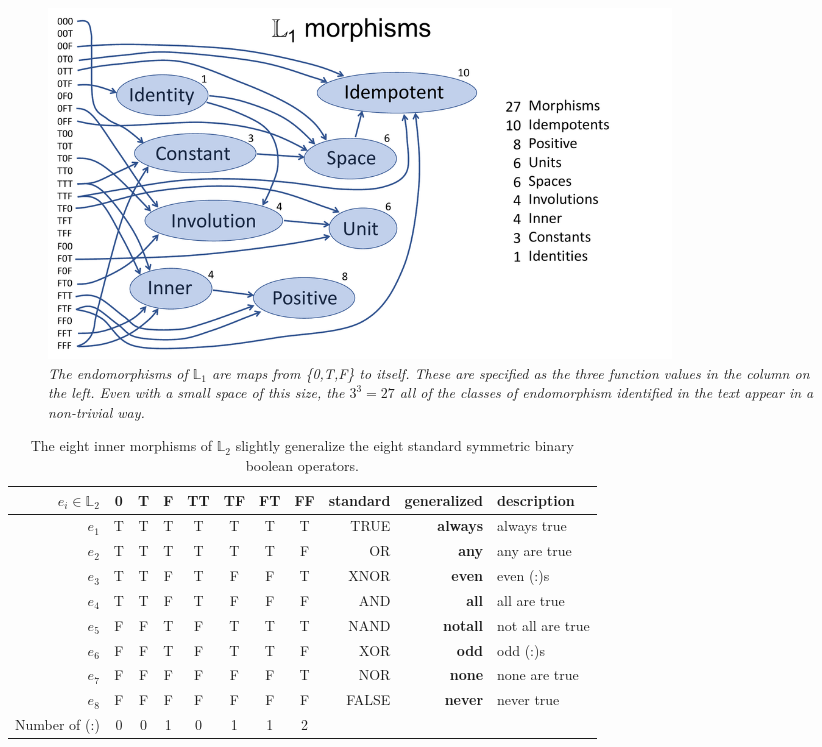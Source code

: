 \documentclass[11pt]{article}
\begin{document}
\begin{figure}[h]
\centering
\includegraphics[width=0.8\textwidth]{L1.pdf}
\caption{{\it The endomorphisms of ${\mathbb L}_1$ are maps from \{0,T,F\} to itself. These are specified as the three function 
values in the column on the left.  Even with a small space of this size, the $3^3=27$ all of the classes of endomorphism identified in the text 
appear in a non-trivial way.}}
\end{figure}
\begin{table}
\caption{The eight inner morphisms of ${\mathbb L}_2$ slightly generalize the eight standard symmetric binary boolean operators.}
\centering 
\begin{tabular}{r c c c c c c c r r l}
\hline\hline
$e_i \in {\mathbb L}_2$ & 0 & T & F & TT & TF & FT & FF & standard & generalized & description \\ [0.5ex] 
\hline
$e_1$  & T & T & T & T & T & T & T & TRUE & {\bf always} & always true \\
$e_2$  & T & T & T & T & T & T & F & OR & {\bf any} & any are true \\
$e_3$  & T & T & F & T & F & F & T & XNOR & {\bf even} & even (:)s \\
$e_4$ & T & T & F & T & F & F & F & AND & {\bf all} & all are true \\
$e_5$ & F & F & T & F & T & T & T & NAND & {\bf notall} & not all are true \\
$e_6$ & F & F & T & F & T & T & F & XOR & {\bf odd} & odd (:)s \\
$e_7$ & F & F & F & F & F & F & T & NOR & {\bf none} & none are true  \\
$e_8$ & F & F & F & F & F & F & F & FALSE & {\bf never} & never true \\
\hline
Number of (:)   & 0 & 0 & 1 & 0 & 1 & 1 & 2 &  \\ 
\hline
\end{tabular}
\label{table:L2}
\end{table} 
\end{document}
